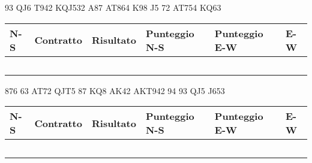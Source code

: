 \documentclass[a4paper,italian,12pt]{article}
\begin{document}
\medskip

\begin{tcolorbox}
\begin{minipage}{.3\textwidth}
\newgame
{}
     {93} {QJ6} {T942}
     {KQJ5}{32} {A87} 
     {AT864} {K98} {J5}
     {72} {AT754} {KQ63}




\hspace{-.2cm}\showAll
\end{minipage}
\begin{minipage}{.7\textwidth}

\renewcommand{\arraystretch}{2}
\begin{tabular}{|l|l|l|l|l|l|}
\hline
N-S & Contratto\hspace{1.5cm} & Risultato& Punteggio N-S & Punteggio E-W & E-W\\\hline
  &&&&&\\\hline
   &&&&&\\\hline
    &&&&&\\\hline
     &&&&&\\\hline
          &&&&&\\\hline
\end{tabular}
\end{minipage}
\end{tcolorbox}

\medskip

\begin{tcolorbox}
\begin{minipage}{.3\textwidth}
\newgame
{}
     {876} {63} {AT72}
     {QJT5} {87} {KQ8}
     {AK42} {AKT942} {94}
     {93} {QJ5} {J653}
    \hspace{-.2cm}\showAll
\end{minipage}
\begin{minipage}{.7\textwidth}

\renewcommand{\arraystretch}{2}
\begin{tabular}{|l|l|l|l|l|l|}
\hline
N-S & Contratto\hspace{1.5cm} & Risultato& Punteggio N-S & Punteggio E-W & E-W\\\hline
  &&&&&\\\hline
   &&&&&\\\hline
    &&&&&\\\hline
     &&&&&\\\hline
          &&&&&\\\hline
\end{tabular}
\end{minipage}
\end{tcolorbox}
\end{document}
